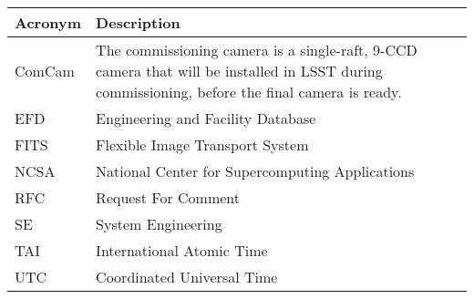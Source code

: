 \addtocounter{table}{-1}
\begin{longtable}{p{}p{}}\hline
\textbf{Acronym} & \textbf{Description}  \\\hline

ComCam & The commissioning camera is a single-raft, 9-CCD camera that will be installed in LSST during commissioning, before the final camera is ready. \\\hline
EFD & Engineering and Facility Database \\\hline
FITS & Flexible Image Transport System \\\hline
NCSA & National Center for Supercomputing Applications \\\hline
RFC & Request For Comment \\\hline
SE & System Engineering \\\hline
TAI & International Atomic Time \\\hline
UTC & Coordinated Universal Time \\\hline
\end{longtable}
